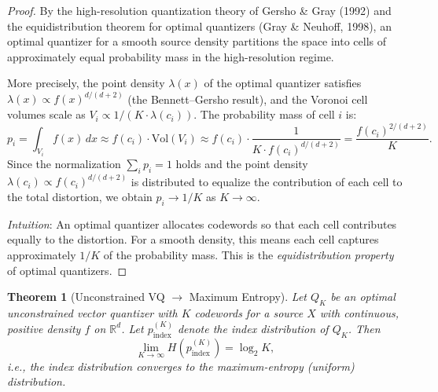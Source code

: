\documentclass[11pt,a4paper]{article}
\newtheorem{theorem}{Theorem}[section]
\theoremstyle{definition}
\theoremstyle{remark}
\newcommand{\R}{\mathbb{R}}
\begin{document}
\begin{proof}
By the high-resolution quantization theory of Gersho \& Gray (1992) and
the equidistribution theorem for optimal quantizers (Gray \& Neuhoff, 1998),
an optimal quantizer for a smooth source density partitions the space into
cells of approximately equal probability mass in the high-resolution regime.

More precisely, the point density $\lambda(x)$ of the optimal quantizer
satisfies $\lambda(x) \propto f(x)^{d/(d+2)}$ (the Bennett--Gersho result),
and the Voronoi cell volumes scale as $V_i \propto 1/(K \cdot \lambda(c_i))$.
The probability mass of cell $i$ is:
\[
p_i = \int_{V_i} f(x)\,dx \approx f(c_i) \cdot \mathrm{Vol}(V_i)
\approx f(c_i) \cdot \frac{1}{K \cdot f(c_i)^{d/(d+2)}}
= \frac{f(c_i)^{2/(d+2)}}{K}.
\]
Since the normalization $\sum_i p_i = 1$ holds and the point density
$\lambda(c_i) \propto f(c_i)^{d/(d+2)}$ is distributed to equalize the
contribution of each cell to the total distortion, we obtain
$p_i \to 1/K$ as $K \to \infty$.

\smallskip
\noindent\textit{Intuition}: An optimal quantizer allocates codewords so
that each cell contributes equally to the distortion. For a smooth density,
this means each cell captures approximately $1/K$ of the probability mass.
This is the \emph{equidistribution property} of optimal quantizers.
\end{proof}

\begin{theorem}[Unconstrained VQ $\to$ Maximum Entropy]
\label{thm:max-entropy}
Let $Q_K$ be an optimal unconstrained vector quantizer with $K$ codewords
for a source $X$ with continuous, positive density $f$ on $\R^d$.
Let $p_{\mathrm{index}}^{(K)}$ denote the index distribution of $Q_K$.
Then
\[
\lim_{K \to \infty} H\!\left(p_{\mathrm{index}}^{(K)}\right) = \log_2 K,
\]
i.e., the index distribution converges to the maximum-entropy (uniform)
distribution.
\end{theorem}
\end{document}
